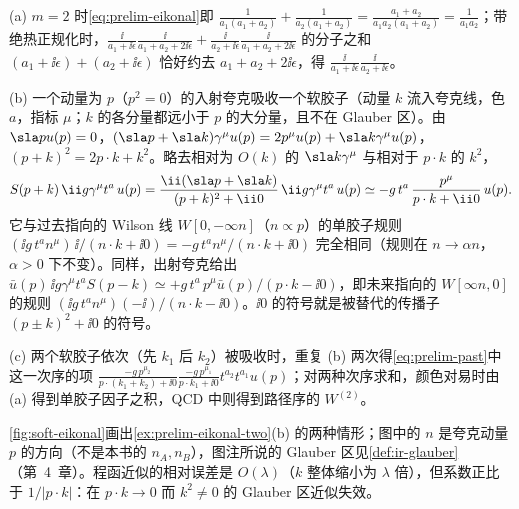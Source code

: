 \begin{example}[$m=2$ 的程函恒等式与入射夸克传播子的程函极限]\label{ex:prelim-eikonal-two}
(a) $m=2$ 时\cref{eq:prelim-eikonal}即 $\frac1{a_1(a_1+a_2)}+\frac1{a_2(a_1+a_2)}=\frac{a_1+a_2}{a_1a_2(a_1+a_2)}=\frac1{a_1a_2}$；带绝热正规化时，$\frac{\ii}{a_1+\ii\epsilon}\frac{\ii}{a_1+a_2+2\ii\epsilon}+\frac{\ii}{a_2+\ii\epsilon}\frac{\ii}{a_1+a_2+2\ii\epsilon}$ 的分子之和 $(a_1+\ii\epsilon)+(a_2+\ii\epsilon)$ 恰好约去 $a_1+a_2+2\ii\epsilon$，得 $\frac{\ii}{a_1+\ii\epsilon}\frac{\ii}{a_2+\ii\epsilon}$。
\par
(b) 一个动量为 $p$（$p^2=0$）的入射夸克吸收一个软胶子（动量 $k$ 流入夸克线，色 $a$，指标 $\mu$；$k$ 的各分量都远小于 $p$ 的大分量，且不在 Glauber 区）。由 $\sla pu(p)=0$，$(\sla p+\sla k)\gamma^\mu u(p)=2p^\mu u(p)+\sla k\gamma^\mu u(p)$，$(p+k)^2=2p\cdot k+k^2$。略去相对为 $O(k)$ 的 $\sla k\gamma^\mu$ 与相对于 $p\cdot k$ 的 $k^2$，
\begin{equation}\label{eq:prelim-eikonal-in}
S(p+k)\,\ii g\gamma^\mu t^a\,u(p)=\frac{\ii(\sla p+\sla k)}{(p+k)^2+\ii0}\,\ii g\gamma^\mu t^a\,u(p)\simeq-g\,t^a\,\frac{p^\mu}{p\cdot k+\ii0}\,u(p). %
\end{equation}
它与过去指向的 Wilson 线 $W[0,-\infty n]$（$n\propto p$）的单胶子规则 $(\ii g\,t^an^\mu)\,\ii/(n\cdot k+\ii0)=-g\,t^an^\mu/(n\cdot k+\ii0)$ 完全相同（规则在 $n\to\alpha n$，$\alpha>0$ 下不变）。同样，出射夸克给出 $\bar u(p)\,\ii g\gamma^\mu t^a S(p-k)\simeq+g\,t^a\,p^\mu\bar u(p)/(p\cdot k-\ii0)$，即未来指向的 $W[\infty n,0]$ 的规则 $(\ii g\,t^an^\mu)(-\ii)/(n\cdot k-\ii0)$。$\ii0$ 的符号就是被替代的传播子 $(p\pm k)^2+\ii0$ 的符号。
\par
(c) 两个软胶子依次（先 $k_1$ 后 $k_2$）被吸收时，重复 (b) 两次得\cref{eq:prelim-past}中这一次序的项 $\frac{-g\,p^{\mu_2}}{p\cdot(k_1+k_2)+\ii0}\frac{-g\,p^{\mu_1}}{p\cdot k_1+\ii0}t^{a_2}t^{a_1}u(p)$；对两种次序求和，颜色对易时由 (a) 得到单胶子因子之积，QCD 中则得到路径序的 $W^{(2)}$。
\end{example}

\cref{fig:soft-eikonal}画出\cref{ex:prelim-eikonal-two}(b) 的两种情形；图中的 $n$ 是夸克动量 $p$ 的方向（不是本书的 $n_A,n_B$），图注所说的 Glauber 区见\cref{def:ir-glauber}（第~4~章）。程函近似的相对误差是 $O(\lambda)$（$k$ 整体缩小为 $\lambda$ 倍），但系数正比于 $1/|p\cdot k|$：在 $p\cdot k\to0$ 而 $k^2\ne0$ 的 Glauber 区近似失效。

